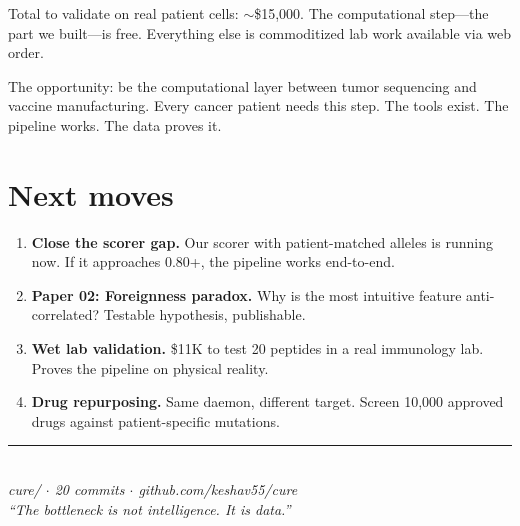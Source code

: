 \documentclass[12pt]{article}
\begin{document}
Total to validate on real patient cells: $\sim$\$15,000. The computational step---the part we built---is free. Everything else is commoditized lab work available via web order.

The opportunity: be the computational layer between tumor sequencing and vaccine manufacturing. Every cancer patient needs this step. The tools exist. The pipeline works. The data proves it.

\section*{Next moves}

\begin{enumerate}[leftmargin=*,itemsep=4pt]
\item \textbf{Close the scorer gap.} Our scorer with patient-matched alleles is running now. If it approaches 0.80+, the pipeline works end-to-end.
\item \textbf{Paper 02: Foreignness paradox.} Why is the most intuitive feature anti-correlated? Testable hypothesis, publishable.
\item \textbf{Wet lab validation.} \$11K to test 20 peptides in a real immunology lab. Proves the pipeline on physical reality.
\item \textbf{Drug repurposing.} Same daemon, different target. Screen 10,000 approved drugs against patient-specific mutations.
\end{enumerate}

\vspace{8pt}
\begin{center}
\rule{0.5\textwidth}{0.5pt}\\[6pt]
\small\textit{cure/ $\cdot$ 20 commits $\cdot$ github.com/keshav55/cure}\\
\small\textit{``The bottleneck is not intelligence. It is data.''}
\end{center}
\end{document}
